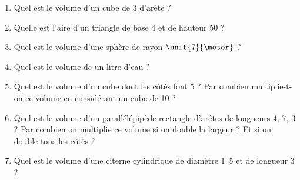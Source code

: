 
\begin{exercice}\label{exoSeconde-0090}

    \begin{multicols}{2}
        \begin{enumerate}
            \item
                Quel est le volume d'un cube de \unit{3}{\centi\meter} d'arête ? 
            \item
                Quelle est l'aire d'un triangle de base \unit{4}{\meter} et de hauteur \unit{50}{\centi\meter} ?
            \item
                Quel est le volume d'une sphère de rayon \( \unit{7}{\meter}\) ?
            \item
                Quel est le volume de un litre d'eau ?
            \item
                Quel est le volume d'un cube dont les côtés font \unit{5}{\meter} ? Par combien multiplie-t-on ce volume en considérant un cube de \unit{10}{\meter} ?
            \item
                Quel est le volume d'un parallélépipède rectangle d'arêtes de longueurs \( 4\), \( 7\), \( 3\) ? Par combien on multiplie ce volume si on double la largeur ? Et si on double tous les côtés ?
            \item
                Quel est le volume d'une citerne cylindrique de diamètre \unit{1.5}{\meter} et de longueur \unit{3}{\meter} ?
        \end{enumerate}
    \end{multicols}

\end{exercice}
